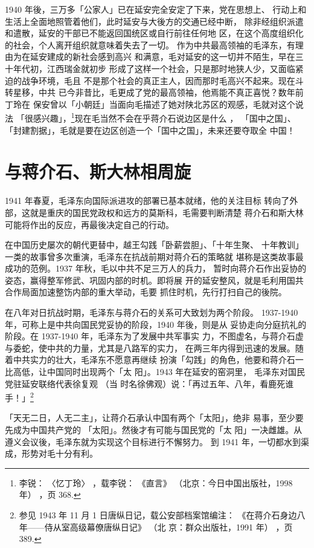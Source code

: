 1940 年後，三万多「公家人」已在延安完全安定了下来，党在思想上、
行动上和生活上全面地照管着他们，此时延安与大後方的交通已经中断，
除非经组织派遣和遣散，延安的干部已不能返回国统区或自行前往任何地
区，在这个高度组织化的社会，个人离开组织就意味着失去了一切。
作为中共最高领袖的毛泽东，有理由为在延安建成的新社会感到高兴
和满意，毛对延安的这一切并不陌生，早在三十年代初，江西瑞金就初步
形成了这样一个社会，只是那时地狭人少，又面临紧迫的战争环境，毛且
不是那个社会的真正主人，因而那时毛高兴不起来。现在斗转星移，中共
已今非昔比，毛更成了党的最高领袖，他焉能不真正喜悦？数年前丁玲在
保安曾以「小朝廷」当面向毛描述了她对陕北苏区的观感，毛就对这个说
法
「很感兴趣」，\footnote{李锐：
〈忆丁玲〉
，载李锐：
《直言》
（北京：今日中国出版社，1998 年）
，页 368. 
}现在毛当然不会在乎蒋介石说边区是什么 ，
「国中之国」、
「封建割据」，毛就是要在边区创造一个「国中之国」，未来还要夺取全
中国！

\section{与蒋介石、斯大林相周旋}
1941 年春夏，毛泽东向国际派进攻的部署已基本就绪，他的关注目标
转向了外部，这就是重庆的国民党政权和远方的莫斯科，毛需要判断清楚
蒋介石和斯大林可能将作出的反应，再最後决定自己的行动。

在中国历史屡次的朝代更替中，越王勾践「卧薪尝胆」、「十年生聚、
十年教训」一类的故事曾多次重演，毛泽东在抗战前期对蒋介石的策略就
堪称是这类故事最成功的范例。1937 年秋，毛以中共不足三万人的兵力，
暂时向蒋介石作出妥协的姿态，赢得整军修武、巩固内部的时机。即将展
开的延安整风，就是毛利用国共合作局面加速整饬内部的重大举动，毛要
抓住时机，先行打扫自己的後院。

在八年对日抗战时期，毛泽东与蒋介石的关系可大致划为两个阶段。
1937-1940 年，可称上是中共向国民党妥协的阶段，1940 年後，则是从
妥协走向分庭抗礼的阶段。在 1937-1940 年，毛泽东为了发展中共军事实
力，不图虚名，与蒋介石虚与委蛇，使中共的力量，尤其是八路军的实力，
在两三年内得到迅速的发展。随着中共实力的壮大，毛泽东不愿意再继续
扮演「勾践」的角色，他要和蒋介石一比高低，让中国同时出现两个「太
阳」。1943 年在延安的窑洞里，
毛泽东对国民党驻延安联络代表徐复观
（当
时名徐佛观）说：「再过五年、八年，看鹿死谁手！」\footnote{参见 1943 年 11 月 1 日唐纵日记，载公安部档案馆编注：
《在蒋介石身边八年——侍从室高级幕僚唐纵日记》
（北
京：群众出版社，1991 年）
，页 389. }

「天无二日，人无二主」，让蒋介石承认中国有两个「太阳」，绝非
易事，至少要先成为中国共产党的
「太阳」。然後才有可能与国民党的「太
阳」一决雌雄。从遵义会议後，毛泽东就为实现这个目标进行不懈努力。
到 1941 年，一切都水到渠成，形势对毛十分有利。

